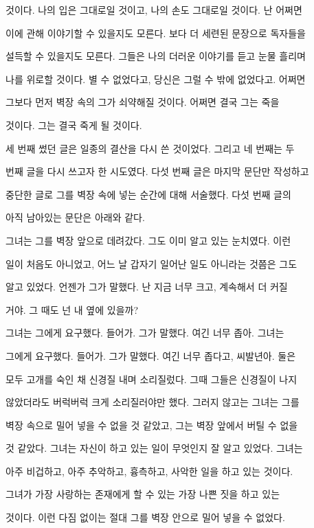 것이다. 나의 입은 그대로일 것이고, 나의 손도 그대로일 것이다. 난 어쩌면

이에 관해 이야기할 수 있을지도 모른다. 보다 더 세련된 문장으로 독자들을

설득할 수 있을지도 모른다. 그들은 나의 더러운 이야기를 듣고 눈물 흘리며

나를 위로할 것이다. 별 수 없었다고, 당신은 그럴 수 밖에 없었다고. 어쩌면

그보다 먼저 벽장 속의 그가 쇠약해질 것이다. 어쩌면 결국 그는 죽을

것이다. 그는 결국 죽게 될 것이다.



세 번째 썼던 글은 일종의 결산을 다시 쓴 것이었다. 그리고 네 번째는 두

번째 글을 다시 쓰고자 한 시도였다. 다섯 번째 글은 마지막 문단만 작성하고

중단한 글로 그를 벽장 속에 넣는 순간에 대해 서술했다. 다섯 번째 글의

아직 남아있는 문단은 아래와 같다.



그녀는 그를 벽장 앞으로 데려갔다. 그도 이미 알고 있는 눈치였다. 이런

일이 처음도 아니었고, 어느 날 갑자기 일어난 일도 아니라는 것쯤은 그도

알고 있었다. 언젠가 그가 말했다. 난 지금 너무 크고, 계속해서 더 커질

거야. 그 때도 넌 내 옆에 있을까?



그녀는 그에게 요구했다. 들어가. 그가 말했다. 여긴 너무 좁아. 그녀는

그에게 요구했다. 들어가. 그가 말했다. 여긴 너무 좁다고, 씨발년아. 둘은

모두 고개를 숙인 채 신경질 내며 소리질렀다. 그때 그들은 신경질이 나지

않았더라도 버럭버럭 크게 소리질러야만 했다. 그러지 않고는 그녀는 그를

벽장 속으로 밀어 넣을 수 없을 것 같았고, 그는 벽장 앞에서 버틸 수 없을

것 같았다. 그녀는 자신이 하고 있는 일이 무엇인지 잘 알고 있었다. 그녀는

아주 비겁하고, 아주 추악하고, 흉측하고, 사악한 일을 하고 있는 것이다.

그녀가 가장 사랑하는 존재에게 할 수 있는 가장 나쁜 짓을 하고 있는

것이다. 이런 다짐 없이는 절대 그를 벽장 안으로 밀어 넣을 수 없었다.



